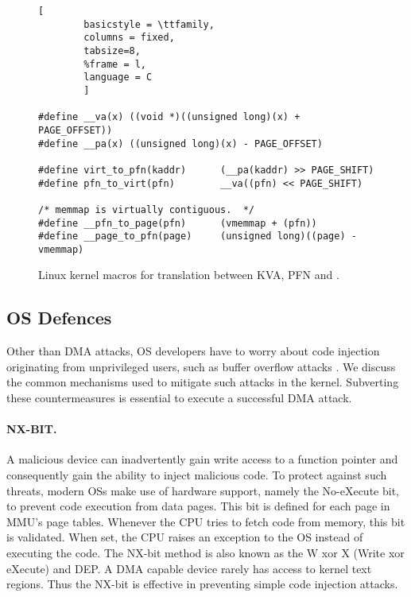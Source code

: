 
\begin{figure*}[t]
                \begin{lstlisting}[
        basicstyle = \ttfamily,
        columns = fixed,
        tabsize=8,
        %frame = l,
        language = C
        ]
        
#define __va(x) ((void *)((unsigned long)(x) + PAGE_OFFSET))
#define __pa(x) ((unsigned long)(x) - PAGE_OFFSET)

#define virt_to_pfn(kaddr)      (__pa(kaddr) >> PAGE_SHIFT)
#define pfn_to_virt(pfn)        __va((pfn) << PAGE_SHIFT)

/* memmap is virtually contiguous.  */
#define __pfn_to_page(pfn)      (vmemmap + (pfn))  
#define __page_to_pfn(page)     (unsigned long)((page) - vmemmap)
                \end{lstlisting}
        \caption{ Linux kernel macros for translation between KVA, PFN and \page{}.
                }
        \label{fig:mem_model}
\end{figure*}

\subsection{OS Defences}

Other than DMA attacks, OS developers have to worry about code injection originating from unprivileged users, such as buffer overflow attacks \cite{nx, kalsr}.
We discuss the common mechanisms used to mitigate such attacks in the kernel. Subverting these countermeasures is essential to execute a successful DMA attack.

\paragraph{NX-BIT.}\label{sec:nx-bit}

A malicious device can inadvertently gain write access to a function pointer and consequently gain the ability to inject malicious code. 
To protect against such threats, modern OSs make use of hardware support, namely the No-eXecute bit, to prevent code execution from data pages. This bit is defined for each page in MMU’s page tables. Whenever the CPU tries to fetch code from memory, this bit is validated. When set, the CPU raises an exception to the OS instead of executing the code. The NX-bit method is also known as the W xor X (Write xor eXecute) and DEP. 
A DMA capable device rarely has access to kernel text regions. Thus the NX-bit is effective in preventing simple code injection attacks.

